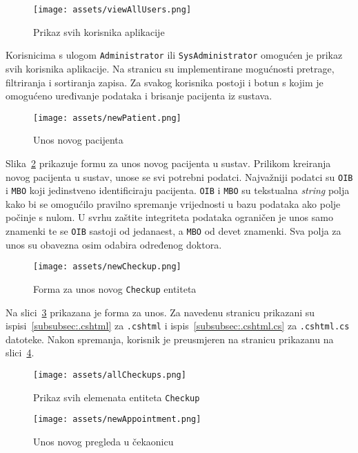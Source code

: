 \begin{figure}[H]
	\texttt{[image: assets/viewAllUsers.png]}
	\centering
	\caption{Prikaz svih korisnika aplikacije}
	\label{fig:allUsers}
\end{figure}

Korisnicima s ulogom \texttt{Administrator} ili \texttt{SysAdministrator} omogućen je prikaz svih korisnika aplikacije. Na stranicu su implementirane mogućnosti pretrage, filtriranja i sortiranja zapisa. Za svakog korisnika postoji i botun s kojim je omogućeno uređivanje podataka i brisanje pacijenta iz sustava.

\begin{figure}[H]
	\texttt{[image: assets/newPatient.png]}
	\centering
	\caption{Unos novog pacijenta}
	\label{fig:newPatient}
\end{figure}

Slika~\ref{fig:newPatient} prikazuje formu za unos novog pacijenta u sustav. Prilikom kreiranja novog pacijenta u sustav, unose se svi potrebni podatci. Najvažniji podatci su \texttt{OIB} i \texttt{MBO} koji jedinstveno identificiraju pacijenta. \texttt{OIB} i \texttt{MBO} su tekstualna \textit{string} polja kako bi se omogućilo pravilno spremanje vrijednosti u bazu podataka ako polje počinje s nulom. U svrhu zaštite integriteta podataka ograničen je unos samo znamenki te se \texttt{OIB} sastoji od jedanaest, a \texttt{MBO} od devet znamenki. Sva polja za unos su obavezna osim odabira određenog doktora. 

\begin{figure}[H]
	\texttt{[image: assets/newCheckup.png]}
	\centering
	\caption{Forma za unos novog \texttt{Checkup} entiteta}
	\label{fig:newCheckup}
\end{figure}

Na slici~\ref{fig:newCheckup} prikazana je forma za unos. Za navedenu stranicu prikazani su ispisi~\ref{subsubsec:.cshtml} za \texttt{.cshtml} i ispis~\ref{subsubsec:.cshtml.cs} za \texttt{.cshtml.cs} datoteke. Nakon spremanja, korisnik je preusmjeren na stranicu prikazanu na slici~\ref{fig:allCheckups}.

\begin{figure}[H]
	\texttt{[image: assets/allCheckups.png]}
	\centering
	\caption{Prikaz svih elemenata entiteta \texttt{Checkup}}
	\label{fig:allCheckups}
\end{figure}

\begin{figure}[H]
	\texttt{[image: assets/newAppointment.png]}
	\centering
	\caption{Unos novog pregleda u čekaonicu}
	\label{fig:newAppointment}
\end{figure}

